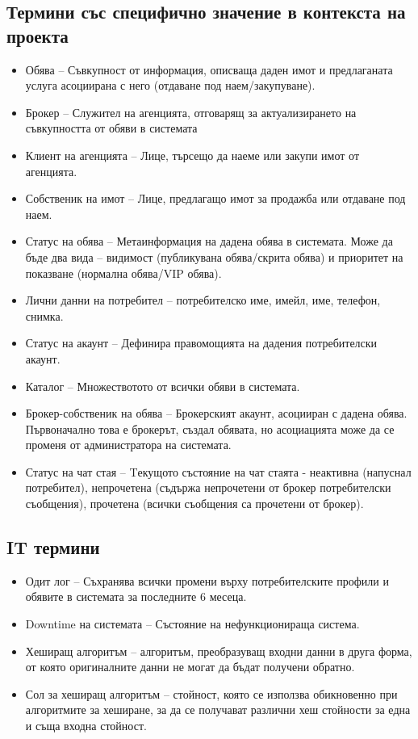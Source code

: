\documentclass[a4paper]{article}
\begin{document}
\subsection{Термини със специфично значение в контекста на проекта}
\begin{itemize}
\item Обява -- Съвкупност от информация, описваща даден имот и предлаганата услуга асоциирана с него (отдаване под наем/закупуване).
\item Брокер -- Служител на агенцията, отговарящ за актуализирането на съвкупността от обяви в системата
\item Клиент на агенцията -- Лице, търсещо да наеме или закупи имот от агенцията.
\item Собственик на имот -- Лице, предлагащо имот за продажба или отдаване под наем. 
\item Статус на обява -- Метаинформация на дадена обява в системата. Може да бъде два вида -- видимост (публикувана обява/скрита обява) и приоритет на показване (нормална обява/VIP обява).
\item Лични данни на потребител -- потребителско име, имейл, име, телефон, снимка.
\item Статус на акаунт -- Дефинира правомощията на дадения потребителски акаунт.
\item Каталог -- Множествотото от всички обяви в системата.
\item Брокер-собственик на обява -- Брокерският акаунт, асоцииран с дадена обява. Първоначално това е брокерът, създал обявата, но асоциацията може да се променя от администратора на системата.
\item Статус на чат стая -- Tекущото състояние на чат стаята - неактивна (напуснал потребител), непрочетена (съдържа непрочетени от брокер потребителски съобщения), прочетена (всички съобщения са прочетени от брокер).
\end{itemize}

\subsection{IT термини}
\begin{itemize}
\item Одит лог -- Съхранява всички промени върху потребителските профили и обявите в системата за последните 6 месеца.
\item Downtime на системата -- Състояние на нефункционираща система.
\item Хеширащ алгоритъм -- алгоритъм, преобразуващ входни данни в друга форма, от която оригиналните данни не могат да бъдат получени обратно.
\item Сол за хеширащ алгоритъм -- стойност, която се използва обикновенно при алгоритмите за хеширане, за да се получават различни хеш стойности за една и съща входна стойност.
\end{itemize}
\end{document}
